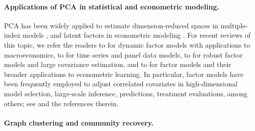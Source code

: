 \paragraph{Applications of PCA in statistical and econometric modeling.}   PCA has been widely applied to estimate dimension-reduced spaces in multiple-index models \citep{Li:92, duan1991slicing,cook2007fisher,xia2009adaptive,li2018sufficient}, and latent factors in econometric modeling \citep{forni2000generalized, stock2002forecasting, bai2002determining,bai2003inferential,bai2009panel,ahn2013eigenvalue,fan2015power,fan2016projected}.
For recent reviews of this topic, we refer the readers to \citet{stock2016dynamic} for dynamic factor models with applications to macroeconomics, to \citet{bai2016econometric} for time series and panel data models, to \citet{fan2020robust} for robust factor models and large covariance estimation, and to \citet{fan2021recent}  for  factor models and their broader applications to econometric learning.  In particular, factor models have been frequently employed to adjust correlated covariates in high-dimensional model selection, large-scale inference, predictions, treatment evaluations, among others;  see \citet{fan2020robust, fan2021recent} and the references therein.




\paragraph{Graph clustering and community recovery.}

